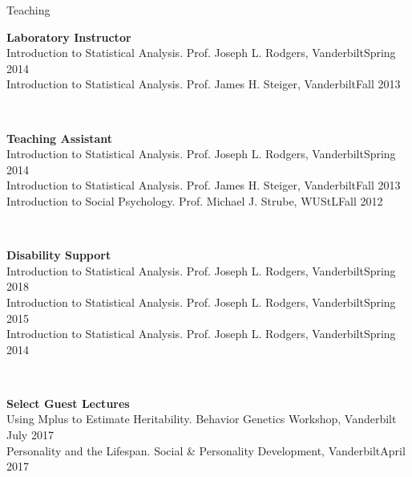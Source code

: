 \begin{rSection}{\textrm{Teaching}}
\begin{minipage}{\linewidth}
{\large {\bf Laboratory Instructor}}\\
Introduction to Statistical Analysis. Prof. Joseph L. Rodgers, Vanderbilt\hfill{Spring 2014}%
\smallskip\\
Introduction to Statistical Analysis. Prof. James H. Steiger, Vanderbilt\hfill{Fall 2013}%
\end{minipage}
\medskip\\
\begin{minipage}{\linewidth}{\large {\bf Teaching Assistant}}\\
Introduction to Statistical Analysis. Prof. Joseph L. Rodgers, Vanderbilt\hfill  {Spring 2014}\smallskip\\
Introduction to Statistical Analysis. Prof. James H. Steiger, Vanderbilt\hfill  {Fall 2013}\smallskip\\
Introduction to Social Psychology. Prof. Michael J. Strube, WUStL\hfill{Fall 2012}\end{minipage}\medskip\\
\begin{minipage}{\linewidth}{\large {\bf Disability Support}}\\
Introduction to Statistical Analysis. Prof. Joseph L. Rodgers, Vanderbilt\hfill  {Spring 2018}\smallskip\\
Introduction to Statistical Analysis. Prof. Joseph L. Rodgers, Vanderbilt\hfill  {Spring 2015}\smallskip\\
Introduction to Statistical Analysis. Prof. Joseph L. Rodgers, Vanderbilt\hfill{Spring 2014}\end{minipage}\medskip\\
\begin{minipage}{\linewidth}{\large {\bf Select Guest Lectures}}\\
Using Mplus to Estimate Heritability. Behavior Genetics Workshop, Vanderbilt \hfill{July 2017}\\
Personality and the Lifespan. Social \& Personality Development, Vanderbilt\hfill {April 2017}\end{minipage}
\end{rSection}
